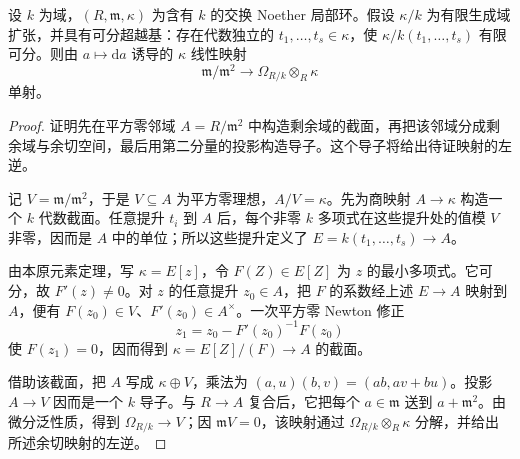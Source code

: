 \begin{lemma}[余切空间的单射]\label{b3:lem:separating-residue-cotangent-injection}
	设 \(k\) 为域，\((R,\mathfrak m,\kappa)\) 为含有 \(k\) 的交换 Noether 局部环。假设 \(\kappa/k\) 为有限生成域扩张，并具有可分超越基：存在代数独立的 \(t_1,\ldots,t_s\in\kappa\)，使 \(\kappa/k(t_1,\ldots,t_s)\) 有限可分。则由 \(a\mapsto\mathrm da\) 诱导的 \(\kappa\) 线性映射
	\[
		\mathfrak m/\mathfrak m^2\longrightarrow \Omega_{R/k}\otimes_R\kappa
	\]
	单射。
\end{lemma}
\begin{proof}
	证明先在平方零邻域 \(A=R/\mathfrak m^2\) 中构造剩余域的截面，再把该邻域分成剩余域与余切空间，最后用第二分量的投影构造导子。这个导子将给出待证映射的左逆。

	记 \(V=\mathfrak m/\mathfrak m^2\)，于是 \(V\subseteq A\) 为平方零理想，\(A/V=\kappa\)。先为商映射 \(A\rightarrow\kappa\) 构造一个 \(k\) 代数截面。任意提升 \(t_i\) 到 \(A\) 后，每个非零 \(k\) 多项式在这些提升处的值模 \(V\) 非零，因而是 \(A\) 中的单位；所以这些提升定义了 \(E=k(t_1,\ldots,t_s)\rightarrow A\)。

	由本原元素定理，写 \(\kappa=E[z]\)，令 \(F(Z)\in E[Z]\) 为 \(z\) 的最小多项式。它可分，故 \(F'(z)\ne0\)。对 \(z\) 的任意提升 \(z_0\in A\)，把 \(F\) 的系数经上述 \(E\rightarrow A\) 映射到 \(A\)，便有 \(F(z_0)\in V\)、\(F'(z_0)\in A^\times\)。一次平方零 Newton 修正
	\[
		z_1=z_0-F'(z_0)^{-1}F(z_0)
	\]
	使 \(F(z_1)=0\)，因而得到 \(\kappa=E[Z]/(F)\rightarrow A\) 的截面。

	借助该截面，把 \(A\) 写成 \(\kappa\oplus V\)，乘法为 \((a,u)(b,v)=(ab,av+bu)\)。投影 \(A\rightarrow V\) 因而是一个 \(k\) 导子。与 \(R\rightarrow A\) 复合后，它把每个 \(a\in\mathfrak m\) 送到 \(a+\mathfrak m^2\)。由微分泛性质，得到 \(\Omega_{R/k}\rightarrow V\)；因 \(\mathfrak mV=0\)，该映射通过 \(\Omega_{R/k}\otimes_R\kappa\) 分解，并给出所述余切映射的左逆。
\end{proof}

